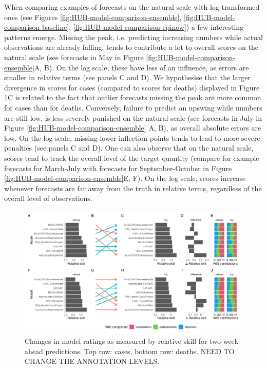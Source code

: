 \documentclass{article}
\begin{document}
When comparing examples of forecasts on the natural scale with log-transformed ones (see Figures \ref{fig:HUB-model-comparison-ensemble}, \ref{fig:HUB-model-comparison-baseline}, \ref{fig:HUB-model-comparison-epinow}) a few interesting patterns emerge. Missing the peak, i.e. predicting increasing numbers while actual observations are already falling, tends to contribute a lot to overall scores on the natural scale (see forecasts in May in Figure \ref{fig:HUB-model-comparison-ensemble}A, B). On the log scale, these have less of an influence, as errors are smaller in relative terms (see panels C and D). We hypothesise that the larger divergence in scores for cases (compared to scores for deaths) displayed in Figure \ref{fig:HUB-pairwise}C is related to the fact that outlier forecasts missing the peak are more common for cases than for deaths. 
Conversely, failure to predict an upswing while numbers are still low, is less severely punished on the natural scale (see forecasts in July in Figure \ref{fig:HUB-model-comparison-ensemble} A, B), as overall absolute errors are low. On the log scale, missing lower inflection points tends to lead to more severe penalties (see panels C and D). One can also observe that on the natural scale, scores tend to track the overall level of the target quantity (compare for example forecasts for March-July with forecasts for September-October in Figure \ref{fig:HUB-model-comparison-ensemble}E, F). On the log scale, scores increase whenever forecasts are far away from the truth in relative terms, regardless of the overall level of observations. 

\begin{figure}[h!]
    \centering
    \includegraphics[width=0.99\textwidth]{output/figures/HUB-pairwise-comparisons.png}
    \caption{Changes in model ratings as measured by relative skill for two-week-ahead predictions. Top row: cases, bottom row: deaths. NEED TO CHANGE THE ANNOTATION LEVELS.}
    \label{fig:HUB-pairwise}
\end{figure}
\end{document}
